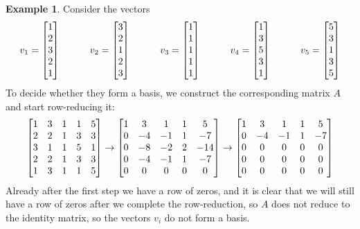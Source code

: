 \documentclass[reqno]{amsart}
\theoremstyle{definition}
\newtheorem{example}[theorem]{Example}
\begin{document}
\begin{example}\label{eg-not-basis}
 Consider the vectors
 \[
   v_1 = \left[\begin{matrix} 1\\2\\3\\2\\1 \end{matrix}\right] \hspace{3em}
   v_2 = \left[\begin{matrix} 3\\2\\1\\2\\3 \end{matrix}\right] \hspace{3em}
   v_3 = \left[\begin{matrix} 1\\1\\1\\1\\1 \end{matrix}\right] \hspace{3em}
   v_4 = \left[\begin{matrix} 1\\3\\5\\3\\1 \end{matrix}\right] \hspace{3em}
   v_5 = \left[\begin{matrix} 5\\3\\1\\3\\5 \end{matrix}\right]
 \]
 To decide whether they form a basis, we construct the corresponding
 matrix $A$ and start row-reducing it:
 \[ \left[\begin{matrix} 1&3&1&1&5 \\ 2&2&1&3&3 \\ 3&1&1&5&1 \\ 2&2&1&3&3 \\ 1&3&1&1&5 \end{matrix}\right]
    \to
    \left[\begin{matrix} 1&3&1&1&5 \\ 0&-4&-1&1&-7 \\ 0&-8&-2&2&-14 \\ 0&-4&-1&1&-7 \\ 0&0&0&0&0 \end{matrix}\right]
    \to
    \left[\begin{matrix} 1&3&1&1&5 \\ 0&-4&-1&1&-7 \\ 0&0&0&0&0 \\ 0&0&0&0&0 \\ 0&0&0&0&0 \end{matrix}\right]
 \]
 Already after the first step we have a row of zeros, and it is clear
 that we will still have a row of zeros after we complete the
 row-reduction, so $A$ does not reduce to the identity matrix, so the
 vectors $v_i$ do not form a basis.
\end{example}
\end{document}
